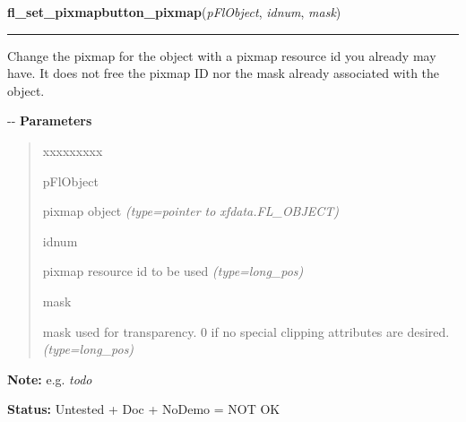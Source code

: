 \hspace{.8\funcindent}\begin{boxedminipage}{\funcwidth}

    \raggedright \textbf{fl\_set\_pixmapbutton\_pixmap}(\textit{pFlObject}, \textit{idnum}, \textit{mask})

    \vspace{-1.5ex}

    \rule{\textwidth}{0.5\fboxrule}
\setlength{\parskip}{2ex}

Change the pixmap for the object with a pixmap resource id you already
may have. It does not free the pixmap ID nor the mask already associated
with the object.

-{}-
\setlength{\parskip}{1ex}
      \textbf{Parameters}
      \vspace{-1ex}

      \begin{quote}
        \begin{Ventry}{xxxxxxxxx}

          \item[pFlObject]


pixmap object
            {\it (type=pointer to xfdata.FL\_OBJECT)}

          \item[idnum]


pixmap resource id to be used
            {\it (type=long\_pos)}

          \item[mask]


mask used for transparency. 0 if no special clipping attributes are
desired.
            {\it (type=long\_pos)}

        \end{Ventry}

      \end{quote}

\textbf{Note:} 
e.g. \emph{todo}


\textbf{Status:} 
Untested + Doc + NoDemo = NOT OK


    \end{boxedminipage}

    \label{xformslib:flbitmap:fl_set_pixmap_colorcloseness}

    \vspace{0.5ex}

